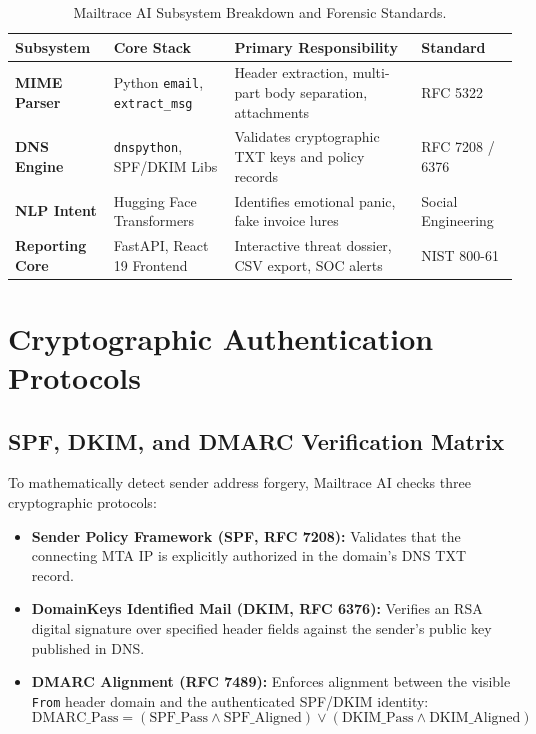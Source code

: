 \documentclass[12pt,a4paper]{report}
\begin{document}
\begin{table}[htbp]
\centering
\small
\begin{tabularx}{\linewidth}{>{\raggedright\arraybackslash\bfseries}p{2.3cm}>{\raggedright\arraybackslash}X>{\raggedright\arraybackslash}X>{\raggedright\arraybackslash}p{2.0cm}}
\toprule
Subsystem & Core Stack & Primary Responsibility & Standard \\
\midrule
MIME Parser & Python \texttt{email}, \texttt{extract\_msg} & Header extraction, multi-part body separation, attachments & RFC 5322 \\
\addlinespace
DNS Engine & \texttt{dnspython}, SPF/DKIM Libs & Validates cryptographic TXT keys and policy records & RFC 7208 / 6376 \\
\addlinespace
NLP Intent & Hugging Face Transformers & Identifies emotional panic, fake invoice lures & Social Engineering \\
\addlinespace
Reporting Core & FastAPI, React 19 Frontend & Interactive threat dossier, CSV export, SOC alerts & NIST 800-61 \\
\bottomrule
\end{tabularx}
\caption{Mailtrace AI Subsystem Breakdown and Forensic Standards.}
\label{tab:mailtrace_subsystems}
\end{table}

\chapter{Cryptographic Authentication Protocols}

\section{SPF, DKIM, and DMARC Verification Matrix}
To mathematically detect sender address forgery, Mailtrace AI checks three cryptographic protocols:
\begin{itemize}[nosep]
    \item \textbf{Sender Policy Framework (SPF, RFC 7208):} Validates that the connecting MTA IP is explicitly authorized in the domain's DNS TXT record.
    \item \textbf{DomainKeys Identified Mail (DKIM, RFC 6376):} Verifies an RSA digital signature over specified header fields against the sender's public key published in DNS.
    \item \textbf{DMARC Alignment (RFC 7489):} Enforces alignment between the visible \texttt{From} header domain and the authenticated SPF/DKIM identity:
    \begin{equation}
    \text{DMARC\_Pass} = (\text{SPF\_Pass} \land \text{SPF\_Aligned}) \lor (\text{DKIM\_Pass} \land \text{DKIM\_Aligned})
    \end{equation}
\end{itemize}
\end{document}

